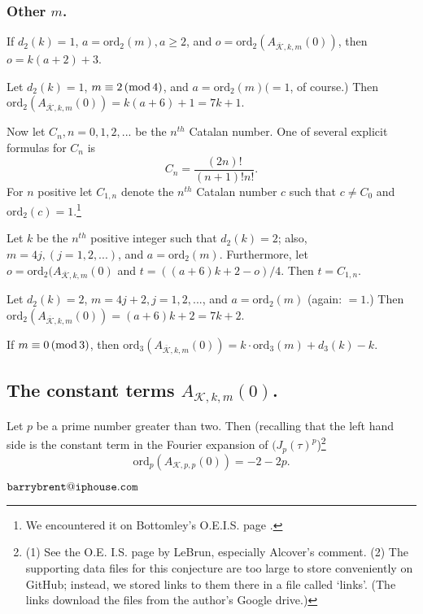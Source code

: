 \documentclass{article}
\begin{document}
\subsubsection[]{Other $m$.}
\begin{conjecture}
If $d_2(k) = 1$, 
$a = \text{ord}_2(m), 
a \geq 2$, and
$o = \text{ord}_2 (A_{\overline{\mathcal{K}},k,m}(0))$,
then $o=k(a+2)+3$.
\end{conjecture}
\begin{conjecture} 
Let $d_2(k) = 1$,
$m \equiv 2 \thinspace 
(\text{mod} \thinspace 4)$,
and $a=\text{ord}_2(m) ( = 1$,
of course.)
Then 
$\text{ord}_2 (A_{\overline{\mathcal{K}},k,m}(0)) =
k(a+6) + 1 = 7k + 1$.
\end{conjecture} \noindent
Now let $C_n, n = 0, 1, 2, ...$ be 
the $n^{th}$ Catalan number. 
One of several explicit formulas 
for $C_n$ is $$C_n = 
\frac{(2n)!}{(n+1)!n!}.$$ \noindent
For $n$ positive
let  $C_{1,n}$ denote the $n^{th}$ 
Catalan number $c$ such that $c \neq C_0$ and $\text{ord}_2(c) = 1$.\footnote{We 
 encountered 
 it on Bottomley's O.E.I.S. page 
\cite{OEISbottomley}.}
\begin{conjecture}
Let 
$k$ be the $n^{th}$ positive integer
such that
$d_2(k) = 2$; also,
$m = 4j, (j = 1, 2,...)$,
and
$a = \text{ord}_2(m)$.
Furthermore, let
$o = \text{ord}_2 (A_{\overline{\mathcal{K}},k,m}(0)$ and 
$ t = ((a+6)k +2 - o)/4$.
Then 
$t = C_{1,n}$.
\end{conjecture}
\begin{conjecture}
Let  $d_2(k) = 2$,
$m = 4j + 2, j = 1, 2, ...$, and 
$a = \text{ord}_2(m)$ (again: $ = 1$.)
Then
$\text{ord}_2 
(A_{\overline{\mathcal{K}},k,m}(0)) = (a+6)k+2
= 7k + 2$.
\end{conjecture}
\begin{conjecture} If
$m \equiv 0 \thinspace 
(\text{mod} \thinspace 3)$,
then $\text{ord}_3 (A_{\overline{\mathcal{K}},k,m}(0))=
k \cdot \text{ord}_3(m) + d_3(k) - k.$
\end{conjecture}
\subsection[]{The constant terms $A_{\mathcal{K},k,m}(0)$.
} 
\begin{conjecture}
 Let $p$ be a prime number greater than two.
Then (recalling that the left hand side is
the constant term in the Fourier expansion
of $(J_p(\tau)^p$)\footnote{(1) See the O.E.
I.S. page by LeBrun\cite{OEISlebrun}, especially Alcover's comment. (2) The supporting data files
for this conjecture are too large to store
conveniently on GitHub; instead, we stored
links to them there in a file
called `links'.\cite{githubNewmanShanks} (The links download the files from the author's Google 
drive.)}
$$\text{ord}_p(A_{\mathcal{K},p,p}(0)) = -2 - 2p.$$
\end{conjecture}
\printbibliography
$\tt{barrybrent@iphouse.com}$
\end{document}
